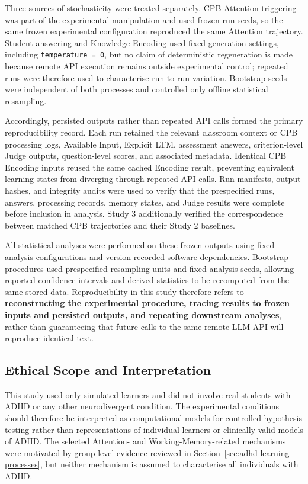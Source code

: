 Three sources of stochasticity were treated separately. CPB Attention triggering was part of the experimental manipulation and used frozen run seeds, so the same frozen experimental configuration reproduced the same Attention trajectory. Student answering and Knowledge Encoding used fixed generation settings, including \texttt{temperature = 0}, but no claim of deterministic regeneration is made because remote API execution remains outside experimental control; repeated runs were therefore used to characterise run-to-run variation. Bootstrap seeds were independent of both processes and controlled only offline statistical resampling.

Accordingly, persisted outputs rather than repeated API calls formed the primary reproducibility record. Each run retained the relevant classroom context or CPB processing logs, Available Input, Explicit LTM, assessment answers, criterion-level Judge outputs, question-level scores, and associated metadata. Identical CPB Encoding inputs reused the same cached Encoding result, preventing equivalent learning states from diverging through repeated API calls. Run manifests, output hashes, and integrity audits were used to verify that the prespecified runs, answers, processing records, memory states, and Judge results were complete before inclusion in analysis. Study 3 additionally verified the correspondence between matched CPB trajectories and their Study 2 baselines.

All statistical analyses were performed on these frozen outputs using fixed analysis configurations and version-recorded software dependencies. Bootstrap procedures used prespecified resampling units and fixed analysis seeds, allowing reported confidence intervals and derived statistics to be recomputed from the same stored data. Reproducibility in this study therefore refers to \textbf{reconstructing the experimental procedure, tracing results to frozen inputs and persisted outputs, and repeating downstream analyses}, rather than guaranteeing that future calls to the same remote LLM API will reproduce identical text.

\subsection{Ethical Scope and Interpretation}
\label{subsec:ethical-scope}

This study used only simulated learners and did not involve real students with ADHD or any other neurodivergent condition. The experimental conditions should therefore be interpreted as computational models for controlled hypothesis testing rather than representations of individual learners or clinically valid models of ADHD. The selected Attention- and Working-Memory-related mechanisms were motivated by group-level evidence reviewed in Section~\ref{sec:adhd-learning-processes}, but neither mechanism is assumed to characterise all individuals with ADHD.

